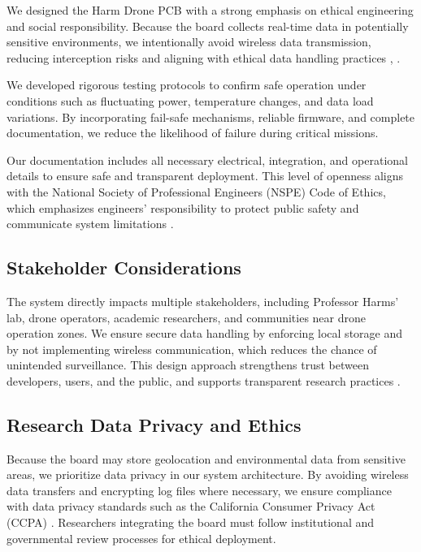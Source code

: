 \documentclass[12pt]{article}
\begin{document}
\par We designed the Harm Drone PCB with a strong emphasis on ethical engineering and social responsibility. Because the board collects real-time data in potentially sensitive environments, we intentionally avoid wireless data transmission, reducing interception risks and aligning with ethical data handling practices \cite{ieee_ethics}, \cite{ccpa}.

\par We developed rigorous testing protocols to confirm safe operation under conditions such as fluctuating power, temperature changes, and data load variations. By incorporating fail-safe mechanisms, reliable firmware, and complete documentation, we reduce the likelihood of failure during critical missions.

\par Our documentation includes all necessary electrical, integration, and operational details to ensure safe and transparent deployment. This level of openness aligns with the National Society of Professional Engineers (NSPE) Code of Ethics, which emphasizes engineers' responsibility to protect public safety and communicate system limitations \cite{nspe2020}.

\subsection{Stakeholder Considerations}

\par The system directly impacts multiple stakeholders, including Professor Harms' lab, drone operators, academic researchers, and communities near drone operation zones. We ensure secure data handling by enforcing local storage and by not implementing wireless communication, which reduces the chance of unintended surveillance. This design approach strengthens trust between developers, users, and the public, and supports transparent research practices \cite{ieee_ethics}.

\subsection{Research Data Privacy and Ethics}

\par Because the board may store geolocation and environmental data from sensitive areas, we prioritize data privacy in our system architecture. By avoiding wireless data transfers and encrypting log files where necessary, we ensure compliance with data privacy standards such as the California Consumer Privacy Act (CCPA) \cite{ccpa}. Researchers integrating the board must follow institutional and governmental review processes for ethical deployment.
\end{document}
